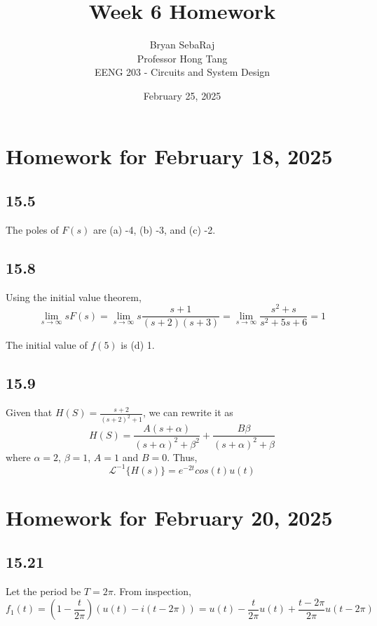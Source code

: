 \documentclass{article}
\title{Week 6 Homework}
\author{Bryan SebaRaj \\[0.7em] Professor Hong Tang \\[0.7em]  EENG 203 - Circuits and System Design}
\date{February 25, 2025}
\begin{document}
\maketitle

\section*{Homework for February 18, 2025}

\subsection*{15.5}

The poles of $F(s)$ are (a) -4, (b) -3, and (c) -2.

\subsection*{15.8}

Using the initial value theorem,
$$\lim_{s \to \infty} sF(s) = \lim_{s \to \infty} s\frac{s+1}{(s+2)(s+3)} = \lim_{s \to \infty} \frac{s^2+s}{s^2+5s+6}=1$$

The initial value of $f(5)$ is (d) 1.

\subsection*{15.9}

Given that $H(S) = \frac{s+2}{(s+2)^2+1}$, we can rewrite it as
$$H(S)=\frac{A(s+\alpha)}{(s+\alpha)^2 + \beta^2} + \frac{B\beta}{(s+\alpha)^2 + \beta}$$
where $\alpha = 2$, $\beta = 1$, $A=1$ and $B=0$. Thus, 
$$\mathcal{L}^{-1}\{H(s)\} = e^{-2t}cos(t)u(t)$$

\section*{Homework for February 20, 2025}

\subsection*{15.21}

Let the period be $T=2\pi$.
From inspection, $$f_1(t) = (1 - \frac{t}{2\pi})(u(t)-i(t-2\pi))=u(t) - \frac{t}{2\pi}u(t) + \frac{t - 2\pi}{2\pi}u(t- 2\pi)$$
\end{document}
